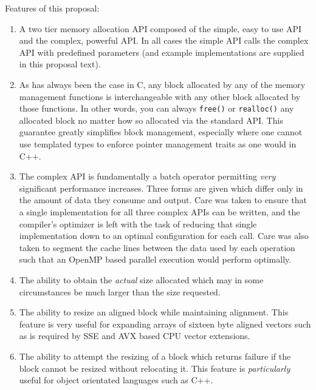 \documentclass[wd]{isov2}
\begin{document}
{\begin{introduction}
Features of this proposal:
\begin{enumerate}
\item A two tier memory allocation API composed of the simple, easy to use API and the complex, powerful API. In all cases the simple API calls the complex API with predefined parameters (and example implementations are supplied in this proposal text).
\item As has always been the case in C, any block allocated by any of the memory management functions is interchangeable with any other block allocated by those functions. In other words, you can always \texttt{free()} or \texttt{realloc()} any allocated block no matter how so allocated via the standard API. This guarantee greatly simplifies block management, especially where one cannot use templated types to enforce pointer management traits as one would in C++.
\item The complex API is fundamentally a batch operator permitting \emph{very} significant performance increases. Three forms are given which differ only in the amount of data they consume and output. Care was taken to ensure that a single implementation for all three complex APIs can be written, and the compiler's optimizer is left with the task of reducing that single implementation down to an optimal configuration for each call. Care was also taken to segment the cache lines between the data used by each operation such that an OpenMP based parallel execution would perform optimally.
\item The ability to obtain the \emph{actual} size allocated which may in some circumstances be much larger than the size requested.
\item The ability to resize an aligned block while maintaining alignment. This feature is very useful for expanding arrays of sixteen byte aligned vectors such as is required by SSE and AVX based CPU vector extensions.
\item The ability to attempt the resizing of a block which returns failure if the block cannot be resized without relocating it. This feature is \emph{particularly} useful for object orientated languages such as C++.

\end{enumerate}
\end{introduction}}
\end{document}
